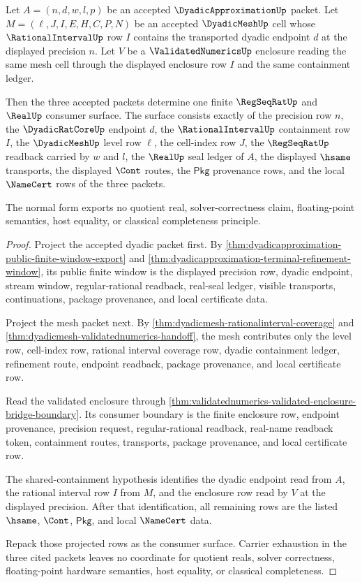 \begin{theorem}
\label{thm:dyadicapproximation-dyadicmesh-validatednumerics-consumer-normal-form}
Let $A=(n,d,w,l,p)$ be an accepted $\DyadicApproximationUp$ packet. Let
$M=(\ell,J,I,E,H,C,P,N)$ be an accepted $\DyadicMeshUp$ cell whose
$\RationalIntervalUp$ row $I$ contains the transported dyadic endpoint $d$ at
the displayed precision $n$. Let $V$ be a $\ValidatedNumericsUp$ enclosure
reading the same mesh cell through the displayed enclosure row $I$ and the same
containment ledger.

Then the three accepted packets determine one finite
$\RegSeqRatUp$ and $\RealUp$ consumer surface. The surface consists exactly of
the precision row $n$, the $\DyadicRatCoreUp$ endpoint $d$, the
$\RationalIntervalUp$ containment row $I$, the $\DyadicMeshUp$ level row
$\ell$, the cell-index row $J$, the $\RegSeqRatUp$ readback carried by $w$ and
$l$, the $\RealUp$ seal ledger of $A$, the displayed $\hsame$ transports, the
displayed $\Cont$ routes, the $\mathsf{Pkg}$ provenance rows, and the local
$\NameCert$ rows of the three packets.

The normal form exports no quotient real, solver-correctness claim,
floating-point semantics, host equality, or classical completeness principle.
\end{theorem}
\begin{proof}
Project the accepted dyadic packet first. By
\autoref{thm:dyadicapproximation-public-finite-window-export} and
\autoref{thm:dyadicapproximation-terminal-refinement-window}, its public
finite window is the displayed precision row, dyadic endpoint, stream window,
regular-rational readback, real-seal ledger, visible transports,
continuations, package provenance, and local certificate data.

Project the mesh packet next. By
\autoref{thm:dyadicmesh-rationalinterval-coverage} and
\autoref{thm:dyadicmesh-validatednumerics-handoff}, the mesh contributes only
the level row, cell-index row, rational interval coverage row, dyadic
containment ledger, refinement route, endpoint readback, package provenance,
and local certificate row.

Read the validated enclosure through
\autoref{thm:validatednumerics-validated-enclosure-bridge-boundary}. Its
consumer boundary is the finite enclosure row, endpoint provenance, precision
request, regular-rational readback, real-name readback token, containment
routes, transports, package provenance, and local certificate row.

The shared-containment hypothesis identifies the dyadic endpoint read from
$A$, the rational interval row $I$ from $M$, and the enclosure row read by $V$
at the displayed precision. After that identification, all remaining rows are
the listed $\hsame$, $\Cont$, $\mathsf{Pkg}$, and local $\NameCert$ data.

Repack those projected rows as the consumer surface. Carrier exhaustion in the
three cited packets leaves no coordinate for quotient reals, solver
correctness, floating-point hardware semantics, host equality, or classical
completeness.
\end{proof}
